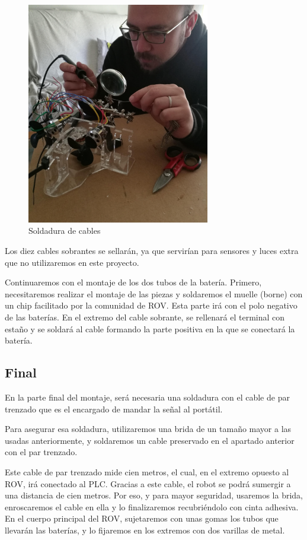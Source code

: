 \begin{figure} [hbtp]
  \begin{center}
    \includegraphics[width=8cm]{img/cap3/3_3/soldar}
  \end{center}
  \caption{Soldadura de cables}
  \label{fig:soldar}
\end{figure}

Los diez cables sobrantes se sellarán, ya que servirían para sensores y luces extra que no  utilizaremos en este proyecto.

Continuaremos con el montaje de los dos tubos de la batería. Primero, necesitaremos realizar el montaje de las piezas y soldaremos el muelle (borne) con un chip facilitado por la comunidad de ROV. Esta parte irá con el polo negativo de las baterías.
En el extremo del cable sobrante, se rellenará el terminal con estaño y se soldará al cable formando la parte positiva en la que se conectará la batería.

\subsection{Final}
\label{subsec:final}

En la parte final del montaje, será necesaria una soldadura con el cable de par trenzado que es el encargado de mandar la señal al portátil.

Para asegurar esa soldadura, utilizaremos una brida de un tamaño mayor a las usadas anteriormente, y soldaremos un cable preservado en el apartado anterior con el par trenzado.

Este cable de par trenzado mide cien metros, el cual, en el extremo opuesto al ROV, irá conectado al PLC. Gracias a este cable, el robot se podrá sumergir a una distancia de cien metros. Por eso, y para mayor seguridad, usaremos la brida, enroscaremos el cable en ella y lo finalizaremos recubriéndolo con cinta adhesiva.
En el cuerpo principal del ROV, sujetaremos con unas gomas los tubos que llevarán las baterías, y lo fijaremos en los extremos con dos varillas de metal.

